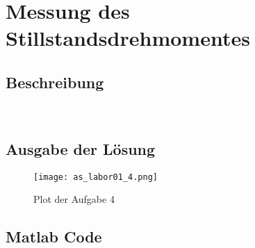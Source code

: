 \section{Messung des Stillstandsdrehmomentes}

\subsection{Beschreibung}
\lipsum[1]\\

\subsection{Ausgabe der Lösung}
\begin{figure}[htp]
 \centering
 \texttt{[image: as\_labor01\_4.png]}
 \caption{Plot der Aufgabe 4}
 \label{fig:PlotAufgabe4}
\end{figure}

\subsection{Matlab Code}

